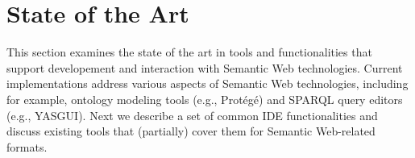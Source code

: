 %
%
%
%
%
%
%
%
%
%
%
%
%
%



\section{State of the Art}%
\label{sec:related_work}

This section examines the state of the art in tools and functionalities that support developement and interaction with Semantic Web technologies. 
Current implementations address various aspects of Semantic Web technologies, including for example, ontology modeling tools (e.g., Protégé) and SPARQL query editors (e.g., YASGUI).
Next we describe a set of common IDE functionalities and discuss existing tools that (partially) cover them for Semantic Web-related formats.



